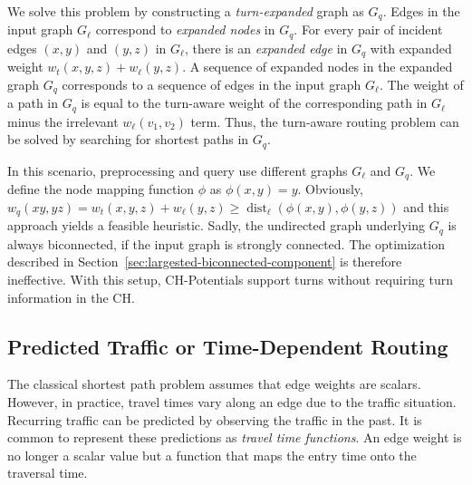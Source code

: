 \documentclass[a4paper,USenglish,cleveref, autoref, thm-restate]{lipics-v2019}
\begin{document}
We solve this problem by constructing a \emph{turn-expanded} graph as $G_q$.
Edges in the input graph $G_\ell$ correspond to \emph{expanded nodes} in $G_q$.
For every pair of incident edges $(x,y)$ and $(y,z)$ in $G_\ell$, there is an \emph{expanded edge} in $G_q$ with expanded weight $w_t(x,y,z) + w_\ell(y,z)$.
A sequence of expanded nodes in the expanded graph $G_q$ corresponds to a sequence of edges in the input graph $G_\ell$.
The weight of a path in $G_q$ is equal to the turn-aware weight of the corresponding path in $G_\ell$ minus the irrelevant $w_\ell(v_1,v_2)$ term.
Thus, the turn-aware routing problem can be solved by searching for shortest paths in $G_q$.

In this scenario, preprocessing and query use different graphs $G_\ell$ and $G_q$.
We define the node mapping function $\phi$ as $\phi(x,y) = y$.
Obviously, $w_q(xy, yz) = w_t(x,y,z) + w_\ell(y,z) \geq \operatorname{dist}_\ell(\phi(x,y), \phi(y,z))$ and this approach yields a feasible heuristic.
Sadly, the undirected graph underlying $G_q$ is always biconnected, if the input graph is strongly connected.
The optimization described in Section~\ref{sec:largested-biconnected-component} is therefore ineffective.
With this setup, CH-Potentials support turns without requiring turn information in the CH.


\subsection{Predicted Traffic or Time-Dependent Routing}
\label{sec:predicted-traffic}

The classical shortest path problem assumes that edge weights are scalars.
However, in practice, travel times vary along an edge due to the traffic situation.
Recurring traffic can be predicted by observing the traffic in the past.
It is common \cite{bgsv-mtdtt-13,bdpw-dtdrp-16,swz-sfert-20} to represent these predictions as \emph{travel time functions}.
An edge weight is no longer a scalar value but a function that maps the entry time onto the traversal time.
\end{document}
